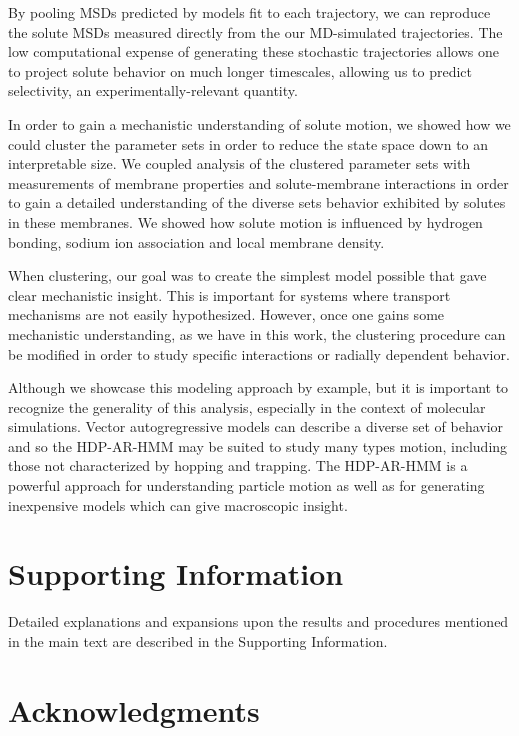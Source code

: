 \documentclass[journal=jpcbfk,manuscript=article]{achemso}
\begin{document}
  By pooling MSDs predicted by models fit to each trajectory, we can reproduce
  the solute MSDs measured directly from the our MD-simulated trajectories. 
  The low computational expense of generating these stochastic trajectories allows
  one to project solute behavior on much longer timescales, allowing us to predict
  selectivity, an experimentally-relevant quantity.
  
  In order to gain a mechanistic understanding of solute motion, we showed how 
  we could cluster the parameter sets in order to reduce the state space down
  to an interpretable size. We coupled analysis of the clustered parameter sets
  with measurements of membrane properties and solute-membrane interactions 
  in order to gain a detailed understanding of the diverse sets behavior 
  exhibited by solutes in these membranes. We showed how
  solute motion is influenced by hydrogen bonding, sodium ion association and local
  membrane density.
  
  When clustering, our goal was to create the simplest model possible that gave
  clear mechanistic insight. This is important for systems where transport mechanisms
  are not easily hypothesized. However, once one gains some mechanistic understanding,
  as we have in this work, the clustering procedure can be modified in order to 
  study specific interactions or radially dependent behavior.
  
  Although we showcase this modeling approach by example, but it is important to
  recognize the generality of this analysis, especially in the context of molecular
  simulations. Vector autogregressive models can describe a diverse set of behavior
  and so the HDP-AR-HMM may be suited to study many types motion, including those not 
  characterized by hopping and trapping. The HDP-AR-HMM is a powerful approach for 
  understanding particle motion as well as for generating inexpensive models
  which can give macroscopic insight.
  
  \section*{Supporting Information}

  Detailed explanations and expansions upon the results and procedures mentioned in
  the main text are described in the Supporting Information. 

  \section*{Acknowledgments}
\end{document}
